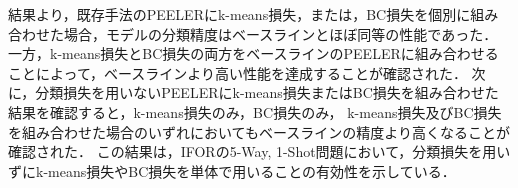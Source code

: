 結果より，既存手法のPEELERにk-means損失，または，BC損失を個別に組み合わせた場合，モデルの分類精度はベースラインとほぼ同等の性能であった．
一方，k-means損失とBC損失の両方をベースラインのPEELERに組み合わせることによって，ベースラインより高い性能を達成することが確認された．
次に，分類損失を用いないPEELERにk-means損失またはBC損失を組み合わせた結果を確認すると，k-means損失のみ，BC損失のみ，
k-means損失及びBC損失を組み合わせた場合のいずれにおいてもベースラインの精度より高くなることが確認された．
この結果は，IFORの5-Way, 1-Shot問題において，分類損失を用いずにk-means損失やBC損失を単体で用いることの有効性を示している．


